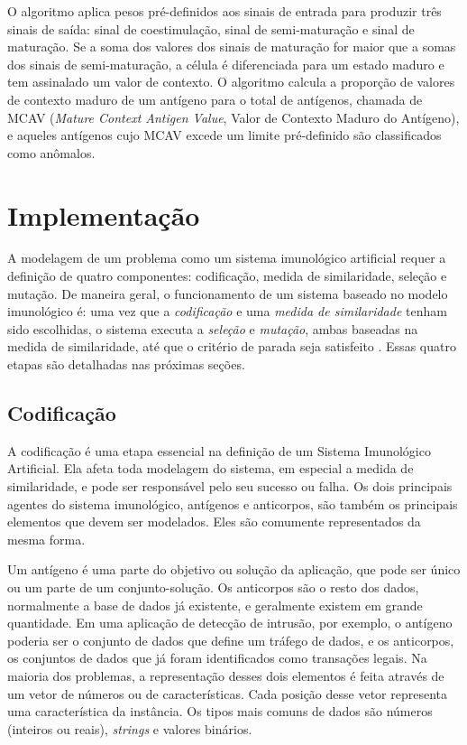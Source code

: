 O algoritmo aplica pesos pré-definidos aos sinais de entrada para produzir três sinais de saída: sinal de coestimulação, sinal de semi-maturação e sinal de maturação. Se a soma dos valores dos sinais de maturação for maior que a somas dos sinais de semi-maturação, a célula é diferenciada para um estado maduro e tem assinalado um valor de contexto. O algoritmo calcula a proporção de valores de contexto maduro de um antígeno para o total de antígenos, chamada de MCAV (\emph{Mature Context Antigen Value}, Valor de Contexto Maduro do Antígeno), e aqueles antígenos cujo MCAV excede um limite pré-definido são classificados como anômalos.

\section{Implementação}

A modelagem de um problema como um sistema imunológico artificial requer a definição de quatro componentes: codificação, medida de similaridade, seleção e mutação. De maneira geral, o funcionamento de um sistema baseado no modelo imunológico é: uma vez que a \emph{codificação} e uma \emph{medida de similaridade} tenham sido escolhidas, o sistema executa a \emph{seleção} e \emph{mutação}, ambas baseadas na medida de similaridade, até que o critério de parada seja satisfeito \cite{Aickelin2005}. Essas quatro etapas são detalhadas nas próximas seções.

\subsection{Codificação}

A codificação é uma etapa essencial na definição de um Sistema Imunológico Artificial. Ela afeta toda modelagem do sistema, em especial a medida de similaridade, e pode ser responsável pelo seu sucesso ou falha. Os dois principais agentes do sistema imunológico, antígenos e anticorpos, são também os principais elementos que devem ser modelados. Eles são comumente representados da mesma forma.

Um antígeno é uma parte do objetivo ou solução da aplicação, que pode ser único ou um parte de um conjunto-solução. Os anticorpos são o resto dos dados, normalmente a base de dados já existente, e geralmente existem em grande quantidade. Em uma aplicação de detecção de intrusão, por exemplo, o antígeno poderia ser o conjunto de dados que define um tráfego de dados, e os anticorpos, os conjuntos de dados que já foram identificados como transações legais. Na maioria dos problemas, a representação desses dois elementos é feita através de um vetor de números ou de características. Cada posição desse vetor representa uma característica da instância. Os tipos mais comuns de dados são números (inteiros ou reais), \emph{strings} e valores binários.

